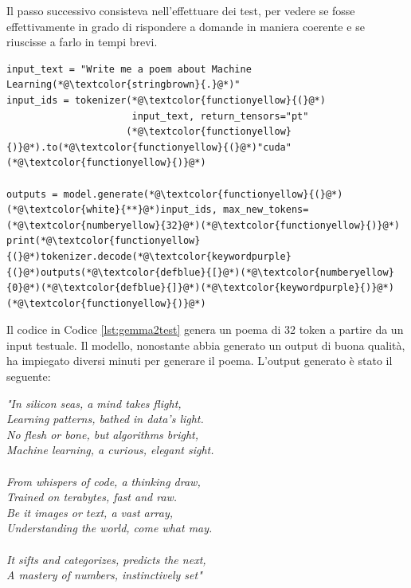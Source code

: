 Il passo successivo consisteva nell'effettuare dei test, per vedere se fosse effettivamente in grado di rispondere a domande in maniera coerente e se riuscisse a farlo in tempi brevi.
\begin{lstlisting}[label=lst:gemma2test, caption={Primo test di Gemma2}]
input_text = "Write me a poem about Machine Learning(*@\textcolor{stringbrown}{.}@*)"
input_ids = tokenizer(*@\textcolor{functionyellow}{(}@*)
                      input_text, return_tensors="pt"
                     (*@\textcolor{functionyellow}{)}@*).to(*@\textcolor{functionyellow}{(}@*)"cuda"(*@\textcolor{functionyellow}{)}@*)

outputs = model.generate(*@\textcolor{functionyellow}{(}@*)(*@\textcolor{white}{**}@*)input_ids, max_new_tokens=(*@\textcolor{numberyellow}{32}@*)(*@\textcolor{functionyellow}{)}@*)
print(*@\textcolor{functionyellow}{(}@*)tokenizer.decode(*@\textcolor{keywordpurple}{(}@*)outputs(*@\textcolor{defblue}{[}@*)(*@\textcolor{numberyellow}{0}@*)(*@\textcolor{defblue}{]}@*)(*@\textcolor{keywordpurple}{)}@*)(*@\textcolor{functionyellow}{)}@*)
\end{lstlisting}
Il codice in Codice \ref{lst:gemma2test} genera un poema di 32 token a partire da un input testuale. Il modello, nonostante abbia generato un output di buona qualità, ha impiegato diversi minuti per generare il poema. L'output generato è stato il seguente:
\begin{center}
    \textit{"In silicon seas, a mind takes flight,} \\
    \textit{Learning patterns, bathed in data's light.} \\
    \textit{No flesh or bone, but algorithms bright,} \\
    \textit{Machine learning, a curious, elegant sight.} \\
    \textit{} \\
    \textit{From whispers of code, a thinking draw,} \\
    \textit{Trained on terabytes, fast and raw.} \\
    \textit{Be it images or text, a vast array,} \\
    \textit{Understanding the world, come what may.} \\
    \textit{} \\
    \textit{It sifts and categorizes, predicts the next,} \\
    \textit{A mastery of numbers, instinctively set"}
\end{center}

